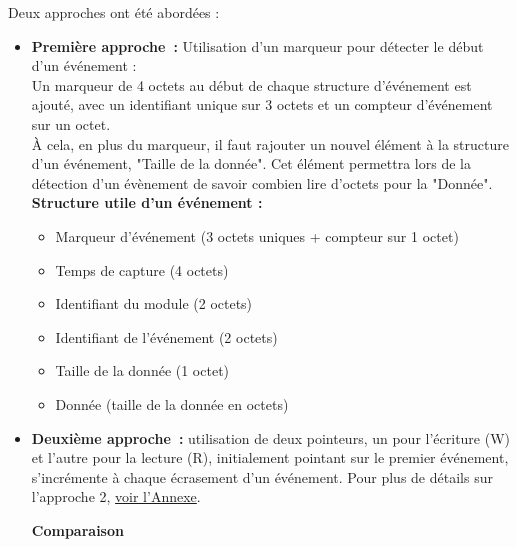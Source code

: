 \documentclass[a4paper, 12pt]{report}
\begin{document}
\begin{enumerate}
    Deux approches ont été abordées :

    \begin{itemize}
    \item \textbf{Première approche :} Utilisation d'un marqueur pour détecter le début d'un événement :\\
        Un marqueur de 4 octets au début de chaque structure d'événement est ajouté, avec un identifiant unique sur 3 octets et un compteur d'événement sur un octet. \\
        À cela, en plus du marqueur, il faut rajouter un nouvel élément à la structure d'un événement, "Taille de la donnée". Cet élément permettra lors de la détection d'un évènement de savoir combien lire d'octets pour la "Donnée".\\
        
        \textbf{Structure utile d’un événement :}
        \begin{itemize}
                \item Marqueur d'événement (3 octets uniques + compteur sur 1 octet)
                \item Temps de capture (4 octets)
                \item Identifiant du module (2 octets)
                \item Identifiant de l'événement (2 octets)
                \item Taille de la donnée (1 octet)
                \item Donnée (taille de la donnée en octets) 
        \end{itemize}
        \vspace{1cm}
        \item \textbf{Deuxième approche :} utilisation de deux pointeurs, un pour l'écriture (W) et l'autre pour la lecture (R), initialement pointant sur le premier événement, s'incrémente à chaque écrasement d'un événement. Pour plus de détails sur l'approche 2, \hyperref[subsec:AP2_L1]{voir l'Annexe}.

    




        \textbf{Comparaison}
        \begin{table}[H]
            \begin{center}
                

\end{center}
\end{table}
\end{itemize}
\end{enumerate}
\end{document}
